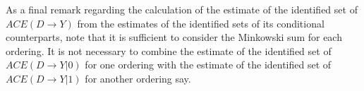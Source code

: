 \documentclass[12pt,a4paper,twoside]{article}
\numberwithin{equation}{section}
\begin{document}
As a final remark regarding the calculation of the estimate of the identified set of $ACE(D\rightarrow Y)$ from the estimates of the identified sets of its conditional counterparts, note that it is sufficient to consider the Minkowski sum for each ordering. It is not necessary to combine the estimate of the identified set of $ACE(D\rightarrow Y|0)$ for one ordering with the estimate of the identified set of $ACE(D\rightarrow Y|1)$ for another ordering say.
%
\end{document}
